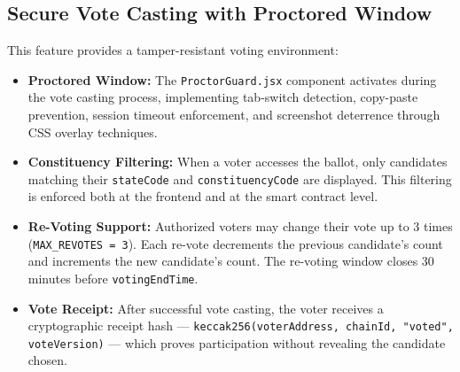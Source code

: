 \documentclass[oneside,a4paper,12pt]{book}
\begin{document}
\subsection{Secure Vote Casting with Proctored Window}
This feature provides a tamper-resistant voting environment:
\begin{itemize}[leftmargin=1.5cm]
    \item \textbf{Proctored Window:} The \texttt{ProctorGuard.jsx} component activates during the vote casting process, implementing tab-switch detection, copy-paste prevention, session timeout enforcement, and screenshot deterrence through CSS overlay techniques.

    \item \textbf{Constituency Filtering:} When a voter accesses the ballot, only candidates matching their \texttt{stateCode} and \texttt{constituencyCode} are displayed. This filtering is enforced both at the frontend and at the smart contract level.

    \item \textbf{Re-Voting Support:} Authorized voters may change their vote up to 3 times (\texttt{MAX\_REVOTES = 3}). Each re-vote decrements the previous candidate's count and increments the new candidate's count. The re-voting window closes 30 minutes before \texttt{votingEndTime}.

    \item \textbf{Vote Receipt:} After successful vote casting, the voter receives a cryptographic receipt hash --- \texttt{keccak256(voterAddress, chainId, "voted", voteVersion)} --- which proves participation without revealing the candidate chosen.
\end{itemize}
\end{document}
